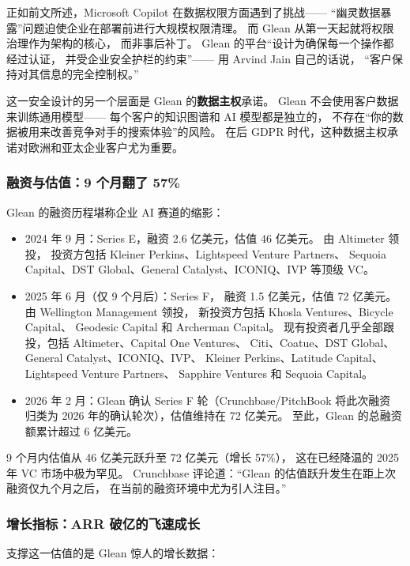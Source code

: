 正如前文所述，Microsoft Copilot 在数据权限方面遇到了挑战——
``幽灵数据暴露''问题迫使企业在部署前进行大规模权限清理。
而 Glean 从第一天起就将权限治理作为架构的核心，
而非事后补丁。
Glean 的平台``设计为确保每一个操作都经过认证，
并受企业安全护栏的约束''——
用 Arvind Jain 自己的话说，
``客户保持对其信息的完全控制权。''

这一安全设计的另一个层面是 Glean 的\textbf{数据主权}承诺。
Glean 不会使用客户数据来训练通用模型——
每个客户的知识图谱和 AI 模型都是独立的，
不存在``你的数据被用来改善竞争对手的搜索体验''的风险。
在后 GDPR 时代，这种数据主权承诺对欧洲和亚太企业客户尤为重要。

\subsubsection{融资与估值：9 个月翻了 57\%}
Glean 的融资历程堪称企业 AI 赛道的缩影：

\begin{itemize}[noitemsep]
  \item 2024 年 9 月：Series E，融资 2.6 亿美元，估值 46 亿美元。
        由 Altimeter 领投，
        投资方包括 Kleiner Perkins、Lightspeed Venture Partners、
        Sequoia Capital、DST Global、General Catalyst、ICONIQ、IVP 等顶级 VC。
  \item 2025 年 6 月（仅 9 个月后）：Series F，
        融资 1.5 亿美元，估值 72 亿美元。
        由 Wellington Management 领投，
        新投资方包括 Khosla Ventures、Bicycle Capital、
        Geodesic Capital 和 Archerman Capital。
        现有投资者几乎全部跟投，包括 Altimeter、Capital One Ventures、
        Citi、Coatue、DST Global、General Catalyst、ICONIQ、IVP、
        Kleiner Perkins、Latitude Capital、Lightspeed Venture Partners、
        Sapphire Ventures 和 Sequoia Capital。
  \item 2026 年 2 月：Glean 确认 Series F 轮（Crunchbase/PitchBook 将此次融资
        归类为 2026 年的确认轮次），估值维持在 72 亿美元。
        至此，Glean 的总融资额累计超过 6 亿美元。
\end{itemize}

9 个月内估值从 46 亿美元跃升至 72 亿美元（增长 57\%），
这在已经降温的 2025 年 VC 市场中极为罕见。
Crunchbase 评论道：``Glean 的估值跃升发生在距上次融资仅九个月之后，
在当前的融资环境中尤为引人注目。''

\subsubsection{增长指标：ARR 破亿的飞速成长}
支撑这一估值的是 Glean 惊人的增长数据：

